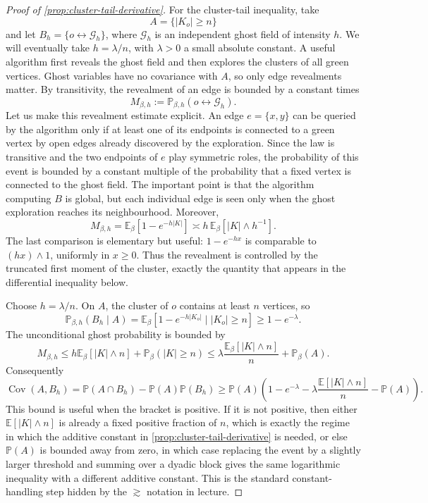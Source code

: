 \documentclass[11pt,reqno]{book}
\numberwithin{equation}{chapter}
\theoremstyle{plain}
\theoremstyle{definition}
\theoremstyle{remark}
\newcommand{\Eb}{\mathbb E_\beta}
\renewcommand{\P}{\mathbb P}
\newcommand{\E}{\mathbb E}
\newcommand{\1}{\mathbf 1}
\newcommand{\as}{\asymp}
\begin{document}
\begin{proof}[Proof of \cref{prop:cluster-tail-derivative}]
For the cluster-tail inequality, take
\[
  A=\{|K_o|\geq n\}
\]
and let \(B_h=\{o\leftrightarrow\mathcal G_h\}\), where
\(\mathcal G_h\) is an independent ghost field of intensity \(h\). We will
eventually take \(h=\lambda/n\), with \(\lambda>0\) a small absolute
constant. A useful algorithm first reveals the ghost field and then explores
the clusters of all green vertices. Ghost variables have no covariance with
\(A\), so only edge revealments matter. By transitivity, the revealment of an
edge is bounded by a constant times
\[
  M_{\beta,h}:=\P_{\beta,h}(o\leftrightarrow\mathcal G_h).
\]
Let us make this revealment estimate explicit. An edge \(e=\{x,y\}\) can be queried by the algorithm only if at least one of its endpoints is connected to a green vertex by open edges already discovered by the exploration. Since the law is transitive and the two endpoints of \(e\) play symmetric roles, the probability of this event is bounded by a constant multiple of the probability that a fixed vertex is connected to the ghost field. The important point is that the algorithm computing \(B\) is global, but each individual edge is seen only when the ghost exploration reaches its neighbourhood.
Moreover,
\[
  M_{\beta,h}
  =
  \Eb[1-e^{-h|K|}]
  \as
  h\,\Eb[|K|\wedge h^{-1}].
\]
The last comparison is elementary but useful: \(1-e^{-hx}\) is comparable to
\((hx)\wedge1\), uniformly in \(x\geq0\). Thus the revealment is controlled by
the truncated first moment of the cluster, exactly the quantity that appears
in the differential inequality below.

Choose \(h=\lambda/n\). On \(A\), the cluster of \(o\) contains at least
\(n\) vertices, so
\[
  \P_{\beta,h}(B_h\mid A)
  =
  \E_\beta[1-e^{-h|K_o|}\mid |K_o|\geq n]
  \geq
  1-e^{-\lambda}.
 \]
The unconditional ghost probability is bounded by
\[
  M_{\beta,h}
  \leq
  h\E_\beta[|K|\wedge n]+\P_\beta(|K|\geq n)
  \leq
  \lambda\frac{\E_\beta[|K|\wedge n]}{n}+\P_\beta(A).
 \]
Consequently
\[
  \operatorname{Cov}(A,B_h)
  =
  \P(A\cap B_h)-\P(A)\P(B_h)
  \geq
  \P(A)\left(1-e^{-\lambda}
        -\lambda\frac{\E[|K|\wedge n]}{n}
        -\P(A)\right).
\]
This bound is useful when the bracket is positive. If it is not positive,
then either \(\E[|K|\wedge n]\) is already a fixed positive fraction of
\(n\), which is exactly the regime in which the additive constant in
\cref{prop:cluster-tail-derivative} is needed, or else \(\P(A)\) is bounded
away from zero, in which case replacing the event by a slightly larger
threshold and summing over a dyadic block gives the same logarithmic
inequality with a different additive constant. This is the standard
constant-handling step hidden by the \(\gtrsim\) notation in lecture.


\end{proof}
\end{document}
